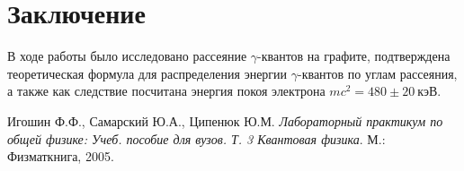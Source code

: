 \documentclass[a4paper,12pt]{article}
\theoremstyle{definition}
\begin{document}
\section*{Заключение}
В ходе работы было исследовано рассеяние $\gamma$-квантов на графите, подтверждена теоретическая формула для распределения энергии $\gamma$-квантов по углам рассеяния, а также как следствие посчитана энергия покоя электрона $mc^2 = 480 \pm 20 ~\text{кэВ}$.
\begin{thebibliography}{9}
Игошин Ф.Ф., Самарский Ю.А., Ципенюк Ю.М. 
\textit{Лабораторный практикум по общей физике: Учеб. пособие для вузов. Т. 3 Квантовая физика}. 
М.: Физматкнига, 2005.
\end{thebibliography}
\end{document}
